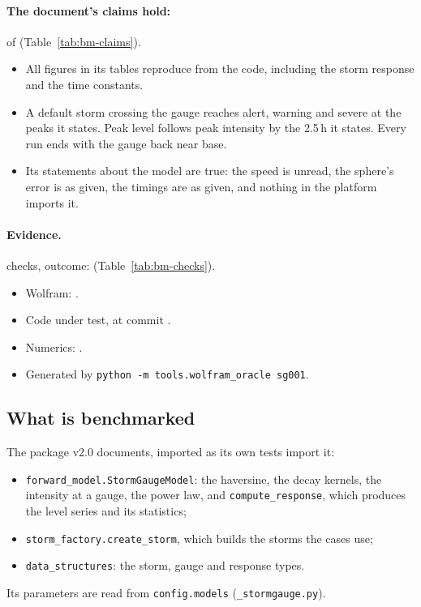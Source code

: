 \documentclass[11pt,a4paper]{article}
\begin{document}
\paragraph{The document's claims hold:} \bmClaimsMet{} of \bmClaims{}
(Table~\ref{tab:bm-claims}).
\begin{itemize}[leftmargin=*,nosep]
\item All \bmFigures{} figures in its tables reproduce from the code, including the
  storm response and the time constants.
\item A default storm crossing the gauge reaches alert, warning and severe at the peaks
  it states. Peak level follows peak intensity by the 2.5\,h it states. Every run ends
  with the gauge back near base.
\item Its statements about the model are true: the speed is unread, the sphere's error
  is as given, the timings are as given, and nothing in the platform imports it.
\end{itemize}

\paragraph{Evidence.} \bmChecks{} checks, outcome: \bmOutcome{}
(Table~\ref{tab:bm-checks}).
\begin{itemize}[leftmargin=*,nosep]
\item Wolfram: \bmWolfram{}\bmWolframVia.
\item Code under test, at commit \bmCodeCommit{}\bmCodeDirty.
\item Numerics: \bmNumerics.
\item Generated \bmGenerated{} by \texttt{python -m tools.wolfram\_oracle sg001}.
\end{itemize}

\mkmpurpose

\subsection{What is benchmarked}
The package v2.0 documents, imported as its own tests import it:
\begin{itemize}[leftmargin=*,nosep]
\item \texttt{forward\_model.StormGaugeModel}: the haversine, the decay kernels, the
  intensity at a gauge, the power law, and \texttt{compute\_response}, which produces
  the level series and its statistics;
\item \texttt{storm\_factory.create\_storm}, which builds the storms the cases use;
\item \texttt{data\_structures}: the storm, gauge and response types.
\end{itemize}
Its parameters are read from \texttt{config.models} (\texttt{\_stormgauge.py}).
\end{document}

